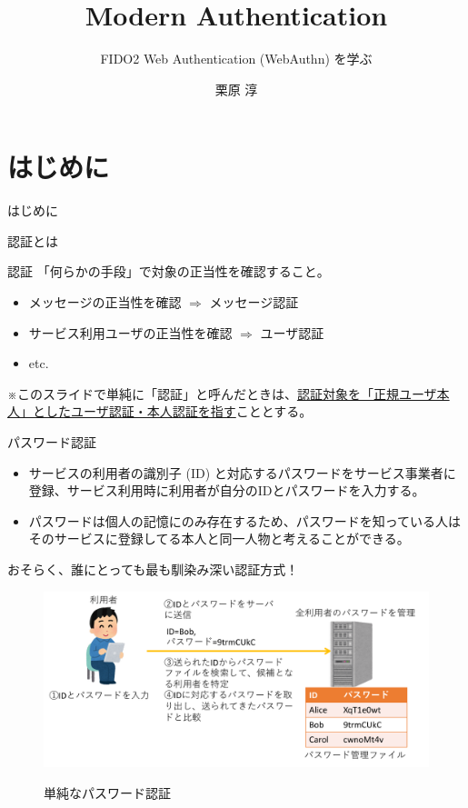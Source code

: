 \documentclass[12pt,dvipdfmx,uplatex]{beamer}
\title[Modern Authentication]{Modern Authentication}
\subtitle{FIDO2 Web Authentication (WebAuthn) を学ぶ}
\author[Jun Kurihara]{栗原 淳}
\institute[U-Hyogo/Zettant]{兵庫県立大学 大学院応用情報科学研究科 \\ 株式会社ゼタント}
\date[]{}
\begin{document}
\begin{frame}
\titlepage
\end{frame}

\section{はじめに}
\begin{frame}
 \centering
 {\Large はじめに}
\end{frame}

\begin{frame}{認証とは}
\begin{block}{認証}
 「何らかの手段」で\alert{対象の正当性を確認する}こと。
\end{block}
\begin{itemize}
 \item メッセージの正当性を確認 $\Rightarrow$ メッセージ認証
 \item サービス利用ユーザの正当性を確認 $\Rightarrow$ ユーザ認証
 \item etc.
\end{itemize}

\vspace{2ex}

※このスライドで単純に「認証」と呼んだときは、\ul{認証対象を「正規ユーザ本人」としたユーザ認証・本人認証を指す}こととする。
\end{frame}

\begin{frame}{パスワード認証}
\begin{itemize}
\item サービスの利用者の識別子 (ID) と対応するパスワードをサービス事業者に登録、サービス利用時に利用者が自分のIDとパスワードを入力する。
\item パスワードは個人の記憶にのみ存在するため、\alert{パスワードを知っている人はそのサービスに登録してる本人と同一人物}と考えることができる。
\end{itemize}

おそらく、誰にとっても最も馴染み深い認証方式！

\end{frame}

\begin{frame}
\begin{figure}
\centering
\includegraphics[width=\linewidth]{Figs/password-auth.pdf}\\
\caption{単純なパスワード認証}
\end{figure}
\end{frame}
\end{document}
